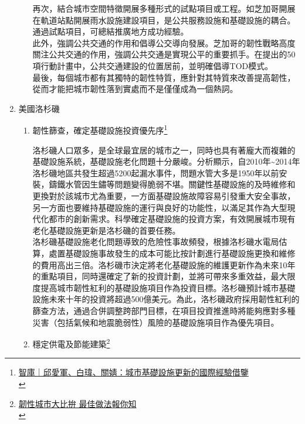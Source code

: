 \documentclass[a4paper,12pt]{article}
\begin{document}
\begin{enumerate}
\begin{enumerate}
再次，結合城市空間特徵開展多種形式的試點項目或工程。如芝加哥開展在軌道站點開展雨水設施建設項目，是公共服務設施和基礎設施的耦合。通過試點項目，可總結推廣地方成功經驗。\\

此外，強調公共交通的作用和倡導公交導向發展。芝加哥的韌性戰略高度關注公共交通的作用，強調公共交通是實現公平的重要抓手。在提出的50項行動計畫中，公共交通建設的位置居前，並明確倡導TOD模式。\\

最後，每個城市都有其獨特的韌性特質，應針對其特質來改善提高韌性，從而才能把城市韌性落到實處而不是僅僅成為一個熱詞。\\
\end{enumerate}

\item 美國洛杉磯
\label{sec:orga9563ef}

\begin{enumerate}
\item 韌性篩查，確定基礎設施投資優先序\footnote{\href{https://news.sina.com.tw/article/20200503/35052898.html}{智庫｜邱愛軍、白瑋、關婧：城市基礎設施更新的國際經驗借鑒}\\\label{orgd8c013f}}
\label{sec:org744802e}

洛杉磯人口眾多，是全球最宜居的城市之一，同時也具有著龐大而複雜的基礎設施系統，基礎設施老化問題十分嚴峻。分析顯示，自2010年\textasciitilde{}2014年洛杉磯地區共發生超過5200起漏水事件，問題水管大多是1950年以前安裝，鑄鐵水管因生鏽等問題變得脆弱不堪。關鍵性基礎設施的及時維修和更換對於該城市尤為重要，一方面基礎設施故障容易引發重大安全事故，另一方面也要維持基礎設施的運行與良好的功能性，以滿足其作為大型現代化都市的創新需求。科學確定基礎設施的投資方案，有效開展城市現有老化基礎設施更新是洛杉磯的首要任務。\\

洛杉磯基礎設施老化問題導致的危險性事故頻發，根據洛杉磯水電局估算，處置基礎設施事故發生的成本可能比按計劃進行基礎設施更換和維修的費用高出三倍。洛杉磯市決定將老化基礎設施的維護更新作為未來10年的重點項目，同時還確定了新的投資計劃，並將可帶來多重效益，最大限度提高城市韌性紅利的基礎設施項目作為投資目標。洛杉磯預計城市基礎設施未來十年的投資將超過500億美元。為此，洛杉磯政府採用韌性紅利的篩查方法，通過合併調整跨部門目標，在項目投資推進時將能夠應對多種災害（包括氣候和地震脆弱性）風險的基礎設施項目作為優先項目。\\

\item 穩定供電及節能建築\footnote{\href{https://www.delta-foundation.org.tw/blogdetail/3021}{韌性城市大比拚 最佳做法報你知}\\}
\label{sec:org83add39}


\end{enumerate}
\end{enumerate}
\end{document}
